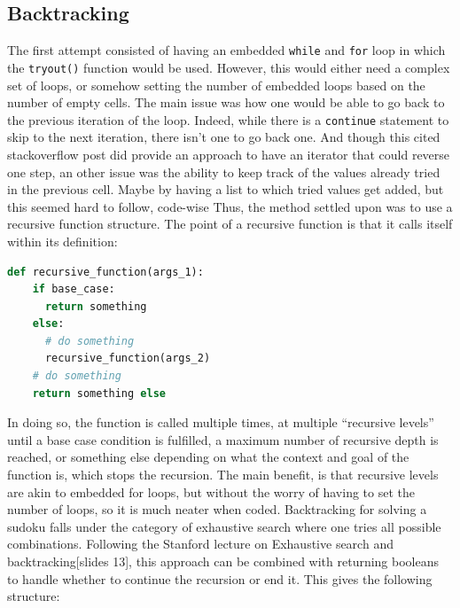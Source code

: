 \documentclass[12pt]{report} %
\begin{document}
\subsection{Backtracking}

The first attempt consisted of having an embedded \texttt{while} and \texttt{for} loop in which the \texttt{tryout()} function would be used. However, this would either need a complex set of loops, or somehow setting the number of embedded loops based on the number of empty cells. The main issue was how one would be able to go back to the previous iteration of the loop. Indeed, while there is a \texttt{continue} statement to skip to the next iteration, there isn't one to go back one\cite{stackoverflow_python_for_loop}. And though this cited stackoverflow post did provide an approach to have an iterator that could reverse one step, an other issue was the ability to keep track of the values already tried in the previous cell\cite{stackoverflow_python_for_loop}. Maybe by having a list to which tried values get added, but this seemed hard to follow, code-wise Thus, the method settled upon was to use a recursive function structure. The point of a recursive function is that it calls itself within its definition\cite{stackoverflow_recursion_python}:

\begin{lstlisting}[language=Python, caption = {Recursive function structure}]
  def recursive_function(args_1):
    if base_case:
      return something
    else:
      # do something
      recursive_function(args_2)
    # do something
    return something else
\end{lstlisting}

In doing so, the function is called multiple times, at multiple ``recursive levels'' until a base case condition is fulfilled, a maximum number of recursive depth is reached\cite{stackoverflow_recursion_depth}, or something else depending on what the context and goal of the function is, which stops the recursion. The main benefit, is  that recursive levels are akin to embedded for loops, but without the worry of having to set the number of loops, so it is much neater when coded.
Backtracking for solving a sudoku falls under the category of exhaustive search where one tries all possible combinations. Following the Stanford lecture on Exhaustive search and backtracking[slides 13]\cite{stanford_lecture}, this approach can be combined with returning booleans to handle whether to continue the recursion or end it. This gives the following structure:
\end{document}

